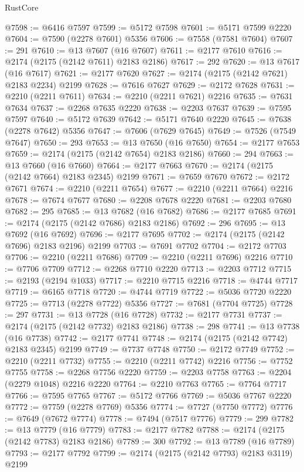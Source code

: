 \begin{lexlean}{RustCore}
\begin{coremodule}
@7598 := @6416 @7597
@7599 := @5172 @7598
@7601 := @5171 @7599 @2220
@7604 := @7590 (@2278 @7601) @5356
@7606 := @7558 (@7581 @7604)
@7607 := 291
@7610 := @13 @7607 (@16 @7607)
@7611 := @2177 @7610
@7616 := @2174 (@2175 (@2142 @7611) @2183 @2186)
@7617 := 292
@7620 := @13 @7617 (@16 @7617)
@7621 := @2177 @7620
@7627 := @2174 (@2175 (@2142 @7621) @2183 @2234) @2199
@7628 := @7616 @7627
@7629 := @2172 @7628
@7631 := @2210 (@2211 @7611)
@7634 := @2210 (@2211 @7621) @2216
@7635 := @7631 @7634
@7637 := @2268 @7635 @2220
@7638 := @2203 @7637
@7639 := @7595 @7597
@7640 := @5172 @7639
@7642 := @5171 @7640 @2220
@7645 := @7638 (@2278 @7642) @5356
@7647 := @7606 (@7629 @7645)
@7649 := @7526 (@7549 @7647)
@7650 := 293
@7653 := @13 @7650 (@16 @7650)
@7654 := @2177 @7653
@7659 := @2174 (@2175 (@2142 @7654) @2183 @2186)
@7660 := 294
@7663 := @13 @7660 (@16 @7660)
@7664 := @2177 @7663
@7670 := @2174 (@2175 (@2142 @7664) @2183 @2345) @2199
@7671 := @7659 @7670
@7672 := @2172 @7671
@7674 := @2210 (@2211 @7654)
@7677 := @2210 (@2211 @7664) @2216
@7678 := @7674 @7677
@7680 := @2208 @7678 @2220
@7681 := @2203 @7680
@7682 := 295
@7685 := @13 @7682 (@16 @7682)
@7686 := @2177 @7685
@7691 := @2174 (@2175 (@2142 @7686) @2183 @2186)
@7692 := 296
@7695 := @13 @7692 (@16 @7692)
@7696 := @2177 @7695
@7702 := @2174 (@2175 (@2142 @7696) @2183 @2196) @2199
@7703 := @7691 @7702
@7704 := @2172 @7703
@7706 := @2210 (@2211 @7686)
@7709 := @2210 (@2211 @7696) @2216
@7710 := @7706 @7709
@7712 := @2268 @7710 @2220
@7713 := @2203 @7712
@7715 := @2193 (@2194 @1033)
@7717 := @2210 @7715 @2216
@7718 := @4744 @7717
@7719 := @6165 @7718
@7720 := @4744 @7719
@7722 := @5036 @7720 @2220
@7725 := @7713 (@2278 @7722) @5356
@7727 := @7681 (@7704 @7725)
@7728 := 297
@7731 := @13 @7728 (@16 @7728)
@7732 := @2177 @7731
@7737 := @2174 (@2175 (@2142 @7732) @2183 @2186)
@7738 := 298
@7741 := @13 @7738 (@16 @7738)
@7742 := @2177 @7741
@7748 := @2174 (@2175 (@2142 @7742) @2183 @2345) @2199
@7749 := @7737 @7748
@7750 := @2172 @7749
@7752 := @2210 (@2211 @7732)
@7755 := @2210 (@2211 @7742) @2216
@7756 := @7752 @7755
@7758 := @2268 @7756 @2220
@7759 := @2203 @7758
@7763 := @2204 (@2279 @1048) @2216 @2220
@7764 := @2210 @7763
@7765 := @7764 @7717
@7766 := @7595 @7765
@7767 := @5172 @7766
@7769 := @5036 @7767 @2220
@7772 := @7759 (@2278 @7769) @5356
@7774 := @7727 (@7750 @7772)
@7776 := @7649 (@7672 @7774)
@7778 := @7494 (@7517 @7776)
@7779 := 299
@7782 := @13 @7779 (@16 @7779)
@7783 := @2177 @7782
@7788 := @2174 (@2175 (@2142 @7783) @2183 @2186)
@7789 := 300
@7792 := @13 @7789 (@16 @7789)
@7793 := @2177 @7792
@7799 := @2174 (@2175 (@2142 @7793) @2183 @3119) @2199

\end{coremodule}
\end{lexlean}

